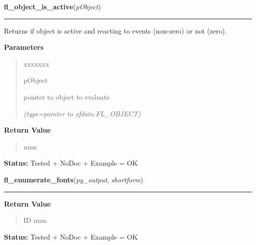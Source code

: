 \hspace{.8\funcindent}\begin{boxedminipage}{\funcwidth}

    \raggedright \textbf{fl\_object\_is\_active}(\textit{pObject})

    \vspace{-1.5ex}

    \rule{\textwidth}{0.5\fboxrule}
\setlength{\parskip}{2ex}
    Returns if object is active and reacting to events (non-zero) or not 
    (zero).

\setlength{\parskip}{1ex}
      \textbf{Parameters}
      \vspace{-1ex}

      \begin{quote}
        \begin{Ventry}{xxxxxxx}

          \item[pObject]

          pointer to object to evaluate

            {\it (type=pointer to xfdata.FL\_OBJECT)}

        \end{Ventry}

      \end{quote}

      \textbf{Return Value}
    \vspace{-1ex}

      \begin{quote}
      num

      \end{quote}

\textbf{Status:} Tested + NoDoc + Example = OK



    \end{boxedminipage}

    \label{xformslib:library:fl_enumerate_fonts}

    \vspace{0.5ex}

\hspace{.8\funcindent}\begin{boxedminipage}{\funcwidth}

    \raggedright \textbf{fl\_enumerate\_fonts}(\textit{py\_output}, \textit{shortform})

    \vspace{-1.5ex}

    \rule{\textwidth}{0.5\fboxrule}
\setlength{\parskip}{2ex}
\setlength{\parskip}{1ex}
      \textbf{Return Value}
    \vspace{-1ex}

      \begin{quote}
      ID num

      \end{quote}

\textbf{Status:} Tested + NoDoc + Example = OK



    \end{boxedminipage}

